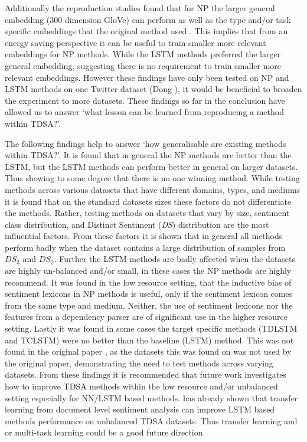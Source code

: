 Additionally the reproduction studies found that for NP the larger general embedding (300 dimension GloVe) can perform as well as the type and/or task specific embeddings that the original method used \citep{vo2015target}. This implies that from an energy saving perspective it can be useful to train smaller more relevant embeddings for NP methods. While the LSTM methods preferred the larger general embedding, suggesting there is no requirement to train smaller more relevant embeddings. However these findings have only been tested on NP and LSTM methods on one Twitter dataset (Dong \citep{dong-etal-2014-adaptive}), it would be beneficial to broaden the experiment to more datasets. These findings so far in the conclusion have allowed us to answer  `what lesson can be learned from reproducing a method within TDSA?’.

The following findings help to answer  `how generalisable are existing methods within TDSA?'. It is found that in general the NP methods are better than the LSTM, but the LSTM methods can perform better in general on larger datasets. Thus showing to some degree that there is no one winning method. While testing methods across various datasets that have different domains, types, and mediums it is found that on the standard datasets sizes these factors do not differentiate the methods. Rather, testing methods on datasets that vary by size, sentiment class distribution, and Distinct Sentiment (\textit{DS}) distribution are the most influential factors. From these factors it is shown that in general all methods perform badly when the dataset contains a large distribution of samples from $DS_3$ and $DS_2$. Further the LSTM methods are badly affected when the datasets are highly un-balanced and/or small, in these cases the NP methods are highly recommend. It was found in the low resource setting, that the inductive bias of sentiment lexicons in NP methods is useful, only if the sentiment lexicon comes from the same type and medium. Neither, the use of sentiment lexicons nor the features from a dependency parser are of significant use in the higher resource setting. Lastly it was found in some cases the target specific methods (TDLSTM and TCLSTM) were no better than the baseline (LSTM) method. This was not found in the original paper \citep{tang-etal-2016-effective}, as the datasets this was found on was not used by the original paper, demonstrating the need to test methods across varying datasets. From these findings it is recommended that future work investigates how to improve TDSA methods within the low resource and/or unbalanced setting especially for NN/LSTM based methods. \citet{he-etal-2018-exploiting} has already shown that transfer learning from document level sentiment analysis can improve LSTM based methods performance on unbalanced TDSA datasets. Thus transfer learning and or multi-task learning could be a good future direction. 

